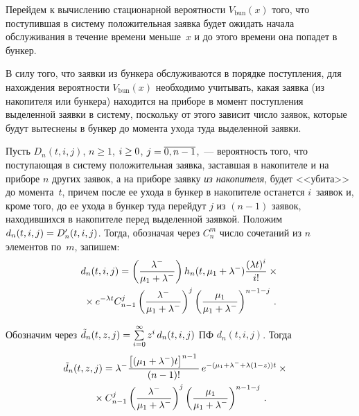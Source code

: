 \begin{multicols}{2}
Перейдем к вычислению стационарной вероятности $V_{\mathrm{bun}}(x)$ того,
что поступившая в систему положительная заявка будет ожидать начала обслуживания
в течение времени меньше~$x$ и до этого времени она попадет в бункер.

В силу того, что заявки из бункера обслуживаются в порядке поступления,
для нахождения вероятности $V_{\mathrm{bun}}(x)$ необходимо учитывать, какая заявка
(из накопителя или бункера) находится на приборе в момент поступления
выделенной заявки в систему, поскольку от этого зависит число
заявок, которые будут вытеснены в бункер до момента ухода туда выделенной заявки.

Пусть $D_n(t,i,j)$,  $n\ge 1$,  $i \hm\ge 0$,  $j\hm=\overline{0,n-1}$,~--- вероятность того, что поступающая в систему 
положительная заявка,
заставшая в накопителе и на приборе $n$ других заявок, а на приборе заявку \textit{из накопителя},
будет <<убита>> до момента~$t$, причем после ее ухода в бункер в накопителе останется $i$~заявок
и, кроме того, до ее ухода в бункер туда перейдут $j$
из $(n-1)$ заявок, находившихся в накопителе перед выделенной заявкой.
Положим $d_n(t,i,j) \hm= D'_n(t,i,j)$.
Тогда, обозначая через $C_{n}^m$ число сочетаний
из $n$ элементов по~$m$, запишем:
\begin{multline*}
d_n(t,i,j) = \left( \displaystyle\frac{\displaystyle \lambda^- \mathstrut}{\displaystyle \mu_1 + \lambda^-\mathstrut}\right)h_n(t,\mu_1+\lambda^-)
\displaystyle\frac{\displaystyle (\lambda t)^i \mathstrut}{\displaystyle i! \mathstrut}\times{}\\
{}\times e^{-\lambda t}
C_{n-1}^j \left(\displaystyle\frac{\displaystyle \lambda^-\mathstrut}{\displaystyle \mu_1 + \lambda^-\mathstrut}\right)^j
          \left(\displaystyle\frac{\displaystyle \mu_1 \mathstrut}{\displaystyle \mu_1 + \lambda^-\mathstrut}\right)^{n-1-j}\,.
\end{multline*}

Обозначим через
$\tilde d_n(t,z,j)\hm=\sum\limits_{i=0}^\infty z^i\, d_n(t,i,j)$
ПФ $d_n(t,i,j)$.
Тогда
\begin{multline*}
\!\!\!\!\!\tilde d_n(t,z,j) = \lambda^-
\displaystyle\frac{\displaystyle \left[(\mu_1+\lambda^-)t\right]^{n-1}\mathstrut}{\displaystyle  (n-1)!\mathstrut}\,
e^{-(\mu_1+\lambda^- + \lambda (1-z))t}\times{}\\
{}\times
C_{n-1}^j \left(\displaystyle\frac{\displaystyle \lambda^-\mathstrut}{\displaystyle \mu_1 + \lambda^-\mathstrut}\right)^j
          \left(\displaystyle\frac{\displaystyle \mu_1 \mathstrut}{\displaystyle \mu_1 + \lambda^-\mathstrut}\right)^{n-1-j}\,.
\end{multline*}



\end{multicols}
